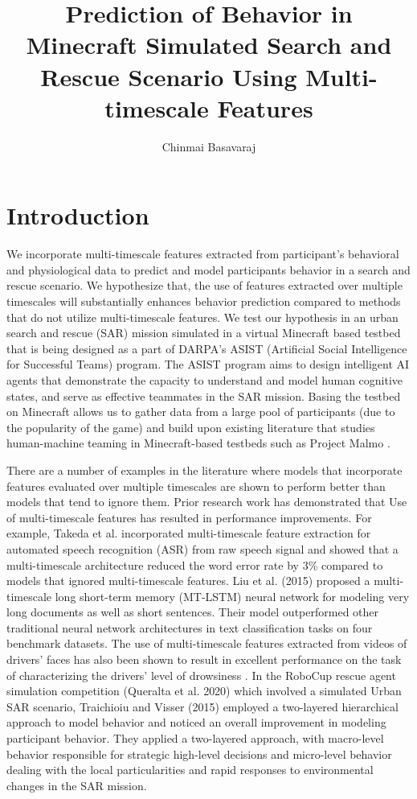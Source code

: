 \documentclass{article}
\title{Prediction of Behavior in Minecraft Simulated Search and Rescue Scenario Using Multi-timescale Features}
\author{Chinmai Basavaraj}
\begin{document}
\onehalfspacing
\section*{Introduction}

We incorporate multi-timescale features extracted from participant’s behavioral
and physiological data to predict and model participants behavior in a search and 
rescue scenario. We hypothesize that, the use of features extracted over multiple
timescales will substantially enhances behavior prediction compared to 
methods that do not utilize multi-timescale features. We test our hypothesis in 
an urban search and rescue (SAR) mission simulated in a virtual Minecraft based 
testbed that is being designed as a part of DARPA’s ASIST 
(Artificial Social Intelligence for Successful Teams) program. The ASIST program aims
to design intelligent AI agents that demonstrate the capacity to understand 
and model human cognitive states, and serve as effective teammates in the SAR mission.
Basing the testbed on Minecraft allows us to gather data from a large pool of 
participants (due to the popularity of the game) and build upon existing literature 
that studies human-machine teaming in Minecraft-based testbeds such as Project 
Malmo \citep{johnson_malmo_nodate}.

There are a number of examples in the literature where models that incorporate 
features evaluated over multiple timescales are shown to perform better than 
models that tend to ignore them. 
Prior research work has demonstrated that Use of multi-timescale features has resulted
in performance improvements. For example, Takeda et al. \citet{takeda_multi-timescale_2018} incorporated
multi-timescale feature extraction for automated speech recognition (ASR) from 
raw speech signal and showed that a multi-timescale architecture reduced the 
word error rate by 3\% compared to models that ignored multi-timescale features. 
Liu et al. (2015) proposed a multi-timescale long short-term memory (MT-LSTM) 
neural network for modeling very long documents as well as short sentences. 
Their model outperformed other traditional neural network architectures 
in text classification tasks on four benchmark datasets. The use of multi-timescale
features extracted from videos of drivers’ faces has also been shown to result in
excellent performance on the task of characterizing the drivers’ level of 
drowsiness \citep{massoz_multi-timescale_2018}.
In the RoboCup rescue agent simulation competition (Queralta et al. 2020) 
which involved a simulated
Urban SAR scenario, Traichioiu and Visser (2015) employed a two-layered hierarchical
approach to model behavior and noticed an overall improvement in modeling 
participant behavior. They applied a two-layered approach, with macro-level behavior
responsible for strategic high-level decisions and micro-level behavior dealing with
the local particularities and rapid responses to environmental changes in the SAR
mission.
\end{document}
